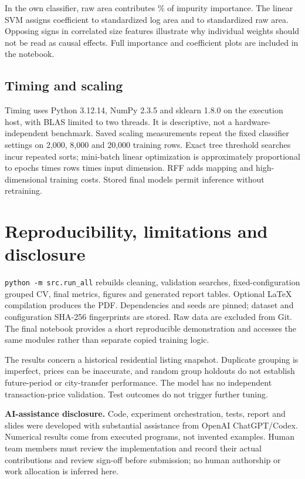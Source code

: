 \documentclass[10pt,twocolumn,a4paper]{article}
\begin{document}
In the own classifier, raw area contributes \areaImportance\% of impurity importance. The linear SVM assigns coefficient \logAreaWeight{} to standardized log area and \rawAreaWeight{} to standardized raw area. Opposing signs in correlated size features illustrate why individual weights should not be read as causal effects. Full importance and coefficient plots are included in the notebook.

\subsection{Timing and scaling}
\begin{table}[t]\centering\small
\caption{One measured final fit and test prediction. Preprocessing is included. Classification prediction time includes labels and score computation.}

\end{table}
Timing uses Python 3.12.14, NumPy 2.3.5 and sklearn 1.8.0 on the execution host, with BLAS limited to two threads. It is descriptive, not a hardware-independent benchmark. Saved scaling measurements repeat the fixed classifier settings on 2,000, 8,000 and 20,000 training rows. Exact tree threshold searches incur repeated sorts; mini-batch linear optimization is approximately proportional to epochs times rows times input dimension. RFF adds mapping and high-dimensional training costs. Stored final models permit inference without retraining.

\section{Reproducibility, limitations and disclosure}
\texttt{python -m src.run\_all} rebuilds cleaning, validation searches, fixed-configuration grouped CV, final metrics, figures and generated report tables. Optional LaTeX compilation produces the PDF. Dependencies and seeds are pinned; dataset and configuration SHA-256 fingerprints are stored. Raw data are excluded from Git. The final notebook provides a short reproducible demonstration and accesses the same modules rather than separate copied training logic.

The results concern a historical residential listing snapshot. Duplicate grouping is imperfect, prices can be inaccurate, and random group holdouts do not establish future-period or city-transfer performance. The model has no independent transaction-price validation. Test outcomes do not trigger further tuning.

\textbf{AI-assistance disclosure.} Code, experiment orchestration, tests, report and slides were developed with substantial assistance from OpenAI ChatGPT/Codex. Numerical results come from executed programs, not invented examples. Human team members must review the implementation and record their actual contributions and review sign-off before submission; no human authorship or work allocation is inferred here.
\end{document}
